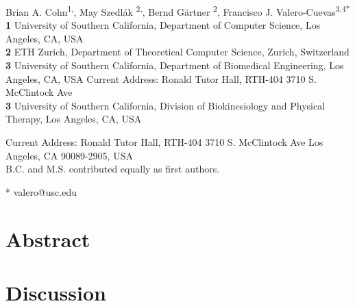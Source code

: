 \documentclass[letterpaper]{article}
\date{}
\begin{document}
\vspace*{0.2in}

\begin{flushleft}
{\Large

\textbf{}
}


Brian A. Cohn\textsuperscript{1,\Yinyang},
May Szedl\'{a}k \textsuperscript{2,\Yinyang},
Bernd G{\"a}rtner \textsuperscript{2},
Francisco J. Valero-Cuevas\textsuperscript{3,4*}
\\
\bigskip
\textbf{1} University of Southern California, Department of Computer Science, Los Angeles, CA, USA
\\
\textbf{2} ETH Zurich, Department of Theoretical Computer Science, Zurich, Switzerland
\\
\textbf{3} University of Southern California, Department of Biomedical Engineering, Los Angeles, CA, USA
Current Address: Ronald Tutor Hall, RTH-404
3710 S. McClintock Ave
\\
\textbf{3} University of Southern California, Division of Biokinesiology and Physical Therapy, Los Angeles, CA, USA

Current Address: Ronald Tutor Hall, RTH-404
3710 S. McClintock Ave
Los Angeles, CA 90089-2905, USA %
\\
\Yinyang  B.C. and M.S. contributed equally as first authors.

* valero@usc.edu

\end{flushleft}
\section*{Abstract}


\pagebreak



\section*{Discussion}
\end{document}
